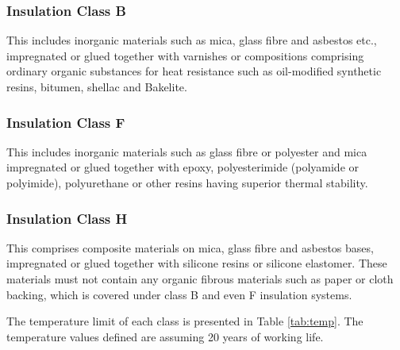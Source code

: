 \subsubsection*{Insulation Class B}
This includes inorganic materials such as mica, glass fibre and asbestos etc., impregnated or glued together with varnishes or compositions comprising ordinary organic substances for heat resistance such as oil-modified synthetic resins, bitumen, shellac and Bakelite.

\subsubsection*{Insulation Class F}
This includes inorganic materials such as glass fibre or polyester and mica impregnated or glued together with epoxy, polyesterimide (polyamide or polyimide), polyurethane or other resins having superior thermal stability.

\subsubsection*{Insulation Class H}
This comprises composite materials on mica, glass fibre and asbestos bases, impregnated or glued together with silicone resins or silicone elastomer. These materials must not contain any organic fibrous materials such as paper or cloth backing, which is covered under class B and even F insulation systems.

The temperature limit of each class is presented in Table \ref{tab:temp}. The temperature values defined are assuming 20 years of working life.

